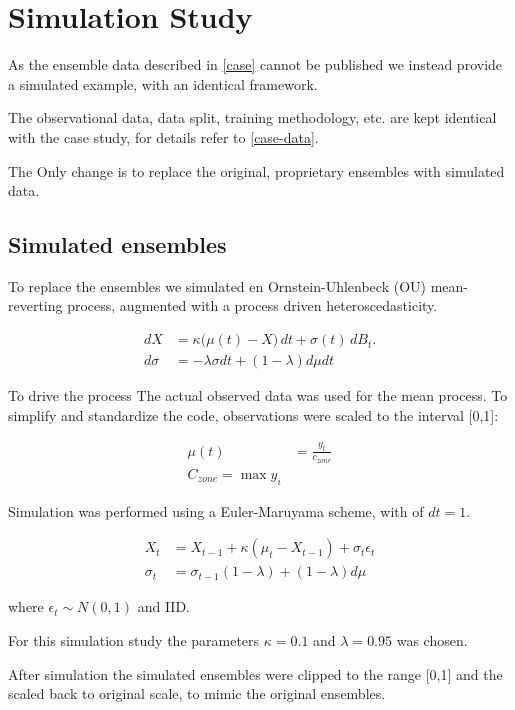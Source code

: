 \section{Simulation Study}
\label{simulation}

As the ensemble data described in \cref{case} cannot be published we instead provide a simulated example, with an identical framework.

The observational data, data split, training methodology, etc. are kept identical with the case study, for details refer to \cref{case-data}. 

The Only change is to replace the original, proprietary ensembles with simulated data.

\subsection{Simulated ensembles}

To replace the ensembles we simulated en Ornstein-Uhlenbeck (OU) mean-reverting process, augmented with a process driven heteroscedasticity.

\begin{align}
    dX &= \kappa\big(\mu(t) - X\big)\,dt + \sigma(t)\, dB_t. \\
    d\sigma &= -\lambda \sigma dt + (1-\lambda)d\mu dt
\end{align}

To drive the process The actual observed data was used for the mean process. To simplify and standardize the code, observations were scaled to the interval [0,1]:

\begin{align}
    \mu(t) &= \frac{y_t}{c_{zone}} \\
    C_{zone} = \max y_i
\end{align}

Simulation was performed using a Euler-Maruyama scheme, with of $dt = 1$.

\begin{align}
    X_t &= X_{t-1} + \kappa(\mu_{t} - X_{t-1}) + \sigma_t\epsilon_t \\
    \sigma_t &= \sigma_{t-1} (1 - \lambda) + (1-\lambda)d\mu
\end{align}

where $\epsilon_t \sim N(0,1)$ and IID.

For this simulation study the parameters $\kappa = 0.1$ and $\lambda = 0.95$ was chosen.

After simulation the simulated ensembles were clipped to the range [0,1] and the scaled back to original scale, to mimic the original ensembles.

